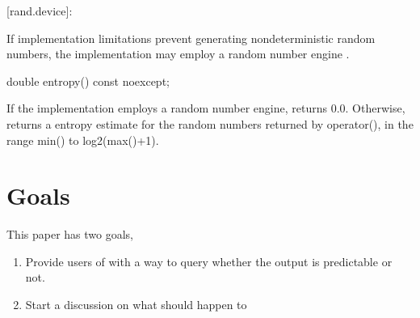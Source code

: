 \documentclass{wg21}
\begin{document}
[rand.device]:

\begin{itemdescr}
    If implementation limitations prevent generating nondeterministic
    random numbers, the implementation may employ a random number engine
    .
\end{itemdescr}

\vskip 0.5cm


\begin{codeblock}
double entropy() const noexcept;
\end{codeblock}

\begin{itemdescr}
    \returns If the implementation employs a random number engine, returns 0.0. Otherwise, returns a  entropy estimate for the random numbers returned by operator(), in the range min() to log2(max()+1).
\end{itemdescr}



\hypertarget{goals}{%
    \section{Goals}\label{goals}}

This paper has two goals, 
\begin{enumerate}
    \item Provide users of  with a way to query
    whether the output is predictable or not.
    \item Start a discussion on what should happen to
\end{enumerate}
\end{document}
